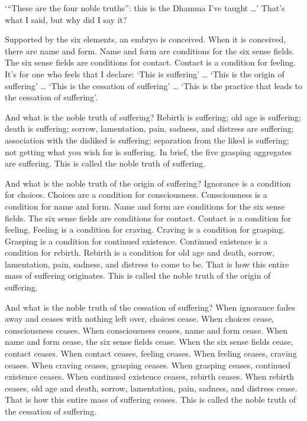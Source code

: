 \documentclass[12pt,openany]{book}%
\begin{document}
‘“These are the four noble truths”: this is the Dhamma I’ve taught …’ That’s what I said, but why did I say it? 

Supported by the six elements, an embryo is conceived. When it is conceived, there are name and form. Name and form are conditions for the six sense fields. The six sense fields are conditions for contact. Contact is a condition for feeling. It’s for one who feels that I declare: ‘This is suffering’ … ‘This is the origin of suffering’ … ‘This is the cessation of suffering’ … ‘This is the practice that leads to the cessation of suffering’. 

And what is the noble truth of suffering? Rebirth is suffering; old age is suffering; death is suffering; sorrow, lamentation, pain, sadness, and distress are suffering; association with the disliked is suffering; separation from the liked is suffering; not getting what you wish for is suffering. In brief, the five grasping aggregates are suffering. This is called the noble truth of suffering. 

And what is the noble truth of the origin of suffering? Ignorance is a condition for choices. Choices are a condition for consciousness. Consciousness is a condition for name and form. Name and form are conditions for the six sense fields. The six sense fields are conditions for contact. Contact is a condition for feeling. Feeling is a condition for craving. Craving is a condition for grasping. Grasping is a condition for continued existence. Continued existence is a condition for rebirth. Rebirth is a condition for old age and death, sorrow, lamentation, pain, sadness, and distress to come to be. That is how this entire mass of suffering originates. This is called the noble truth of the origin of suffering. 

And what is the noble truth of the cessation of suffering? When ignorance fades away and ceases with nothing left over, choices cease. When choices cease, consciousness ceases. When consciousness ceases, name and form cease. When name and form cease, the six sense fields cease. When the six sense fields cease, contact ceases. When contact ceases, feeling ceases. When feeling ceases, craving ceases. When craving ceases, grasping ceases. When grasping ceases, continued existence ceases. When continued existence ceases, rebirth ceases. When rebirth ceases, old age and death, sorrow, lamentation, pain, sadness, and distress cease. That is how this entire mass of suffering ceases. This is called the noble truth of the cessation of suffering. 
\end{document}
